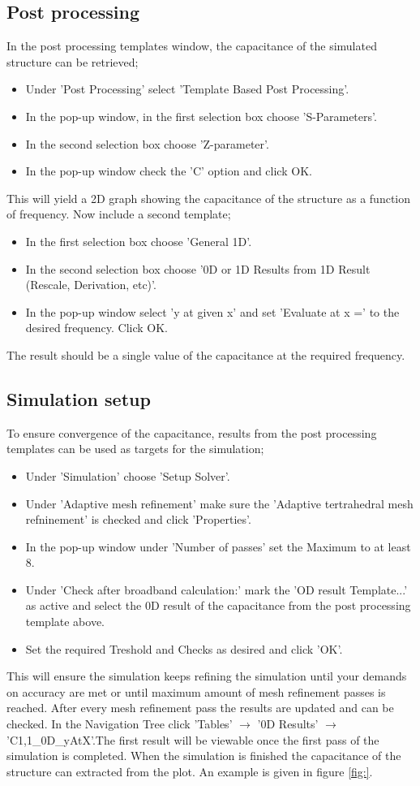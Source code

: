 \subsection{Post processing}
In the post processing templates window, the capacitance of the simulated structure can be retrieved; 
\begin{itemize}
	\item Under 'Post Processing' select 'Template Based Post Processing'.
	\item In the pop-up window, in the first selection box choose 'S-Parameters'.
	\item In the second selection box choose 'Z-parameter'.
	\item In the pop-up window check the 'C' option and click OK.
\end{itemize}
This will yield a 2D graph showing the capacitance of the structure as a function of frequency.
Now include a second template;
\begin{itemize}
	\item In the first selection box choose 'General 1D'.
	\item In the second selection box choose '0D or 1D Results from 1D Result (Rescale, Derivation, etc)'.
	\item In the pop-up window select 'y at given x' and set 'Evaluate at x =' to the desired frequency. Click OK.
\end{itemize}
The result should be a single value of the capacitance at the required frequency.
\subsection{Simulation setup}
To ensure convergence of the capacitance, results from the post processing templates can be used as targets for the simulation;
\begin{itemize}
	\item Under 'Simulation' choose 'Setup Solver'.
	\item Under 'Adaptive mesh refinement' make sure the 'Adaptive tertrahedral mesh refninement' is checked and click 'Properties'.
	\item In the pop-up window under 'Number of passes' set the Maximum to at least 8.
	\item Under 'Check after broadband calculation:' mark the 'OD result Template...' as active and select the 0D result of the capacitance from the post processing template above. 
	\item Set the required Treshold and Checks as desired and click 'OK'.
\end{itemize}
This will ensure the simulation keeps refining the simulation until your demands on accuracy are met or until maximum amount of mesh refinement passes is reached. After every mesh refinement pass the results are updated and can be checked. In the Navigation Tree click 'Tables' \(\rightarrow\) '0D Results' \(\rightarrow\) 'C1,1\_0D\_yAtX'.The first result will be viewable once the first pass of the simulation is completed. When the simulation is finished the capacitance of the structure can extracted from the plot. An example is given in figure \ref{fig:}.


